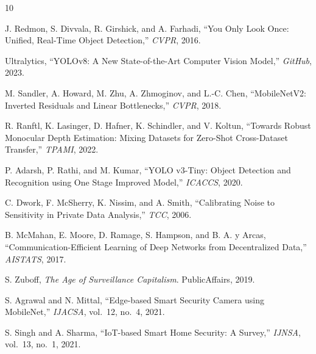 \documentclass[12pt,a4paper]{article}
\begin{document}
\begin{thebibliography}{10}

J. Redmon, S. Divvala, R. Girshick, and A. Farhadi,
``You Only Look Once: Unified, Real-Time Object Detection,''
\textit{CVPR}, 2016.

Ultralytics,
``YOLOv8: A New State-of-the-Art Computer Vision Model,''
\textit{GitHub}, 2023.

M. Sandler, A. Howard, M. Zhu, A. Zhmoginov, and L.-C. Chen,
``MobileNetV2: Inverted Residuals and Linear Bottlenecks,''
\textit{CVPR}, 2018.

R. Ranftl, K. Lasinger, D. Hafner, K. Schindler, and V. Koltun,
``Towards Robust Monocular Depth Estimation: Mixing Datasets for Zero-Shot
Cross-Dataset Transfer,''
\textit{TPAMI}, 2022.

P. Adarsh, P. Rathi, and M. Kumar,
``YOLO v3-Tiny: Object Detection and Recognition using One Stage Improved Model,''
\textit{ICACCS}, 2020.

C. Dwork, F. McSherry, K. Nissim, and A. Smith,
``Calibrating Noise to Sensitivity in Private Data Analysis,''
\textit{TCC}, 2006.

B. McMahan, E. Moore, D. Ramage, S. Hampson, and B. A. y Arcas,
``Communication-Efficient Learning of Deep Networks from Decentralized Data,''
\textit{AISTATS}, 2017.

S. Zuboff,
\textit{The Age of Surveillance Capitalism}.
PublicAffairs, 2019.

S. Agrawal and N. Mittal,
``Edge-based Smart Security Camera using MobileNet,''
\textit{IJACSA}, vol.\ 12, no.\ 4, 2021.

S. Singh and A. Sharma,
``IoT-based Smart Home Security: A Survey,''
\textit{IJNSA}, vol.\ 13, no.\ 1, 2021.

\end{thebibliography}
\end{document}
